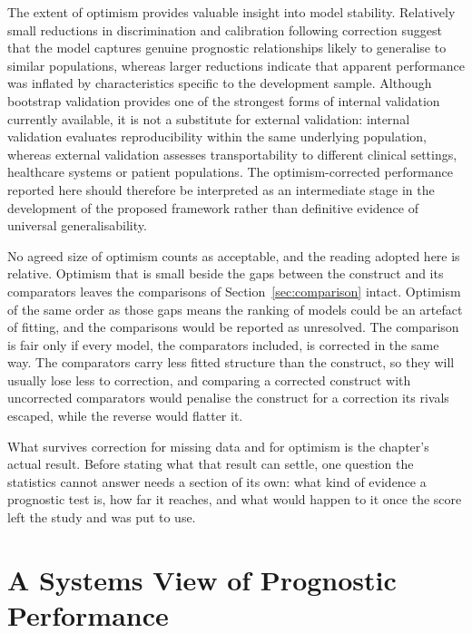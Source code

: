 The extent of optimism provides valuable insight into model stability. Relatively small reductions in discrimination and calibration following correction suggest that the model captures genuine prognostic relationships likely to generalise to similar populations, whereas larger reductions indicate that apparent performance was inflated by characteristics specific to the development sample. Although bootstrap validation provides one of the strongest forms of internal validation currently available, it is not a substitute for external validation: internal validation evaluates reproducibility within the same underlying population, whereas external validation assesses transportability to different clinical settings, healthcare systems or patient populations. The optimism-corrected performance reported here should therefore be interpreted as an intermediate stage in the development of the proposed framework rather than definitive evidence of universal generalisability.

No agreed size of optimism counts as acceptable, and the reading adopted here is relative. Optimism that is small beside the gaps between the construct and its comparators leaves the comparisons of Section~\ref{sec:comparison} intact. Optimism of the same order as those gaps means the ranking of models could be an artefact of fitting, and the comparisons would be reported as unresolved. The comparison is fair only if every model, the comparators included, is corrected in the same way. The comparators carry less fitted structure than the construct, so they will usually lose less to correction, and comparing a corrected construct with uncorrected comparators would penalise the construct for a correction its rivals escaped, while the reverse would flatter it.

\medskip
{}

\medskip
\noindent What survives correction for missing data and for optimism is the chapter's actual result. Before stating what that result can settle, one question the statistics cannot answer needs a section of its own: what kind of evidence a prognostic test is, how far it reaches, and what would happen to it once the score left the study and was put to use.

\section{A Systems View of Prognostic Performance}
\label{sec:prog-systems}

